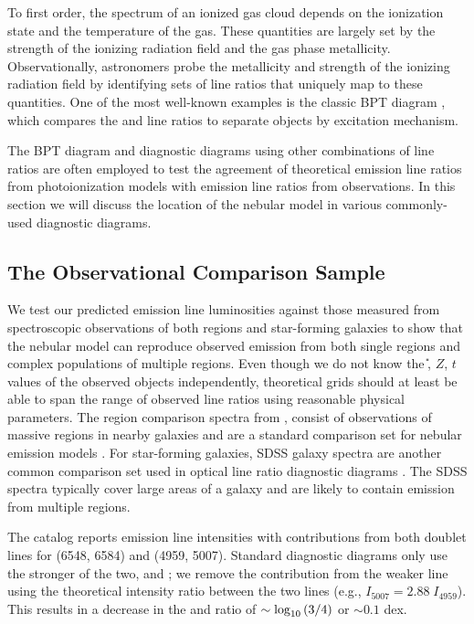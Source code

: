 To first order, the spectrum of an ionized gas cloud depends on the ionization state and the temperature of the gas. These quantities are largely set by the strength of the ionizing radiation field and the gas phase metallicity. Observationally, astronomers probe the metallicity and strength of the ionizing radiation field by identifying sets of line ratios that uniquely  map to these quantities. One of the most well-known examples is the classic BPT diagram \citep{BPT}, which compares the \niiha{} and \oiiihb{} line ratios to separate objects by excitation mechanism.

The BPT diagram and diagnostic diagrams using other combinations of line ratios are often employed to test the agreement of theoretical emission line ratios from photoionization models with emission line ratios from observations. In this section we will discuss the location of the \FSPS nebular model in various commonly-used diagnostic diagrams.

\subsection{The Observational Comparison Sample}

We test our predicted emission line luminosities against those measured from spectroscopic observations of both \hii regions and star-forming galaxies to show that the \FSPS nebular model can reproduce observed emission from both single \hii regions and complex populations of multiple \hii regions. Even though we do not know the \U{}, $Z$, $t$ values of the observed objects independently, theoretical grids should at least be able to span the range of observed line ratios using reasonable physical parameters. The \hii region comparison spectra from \citet{vanzee98}, consist of observations of massive \hii regions in nearby galaxies and are a standard comparison set for nebular emission models \citep{Dopita00, Kewley06, Levesque10, Dopita13}. For star-forming galaxies, SDSS galaxy spectra are another common comparison set used in optical line ratio diagnostic diagrams \citep{Dopita00, Kewley06, Levesque10}. The SDSS spectra typically cover large areas of a galaxy and are likely to contain emission from multiple \hii regions.

The \citet{vanzee98} catalog reports emission line intensities with contributions from both doublet lines for \nii{} (6548, 6584) and \oiii{} (4959, 5007). Standard diagnostic diagrams only use the stronger of the two, \nii{} and \oiii{}; we remove the contribution from the weaker line using the theoretical intensity ratio between the two lines (e.g., $I_{5007} = 2.88\;I_{4959}$). This results in a decrease in the \niiha{} and \oiiihb{} ratio of $\sim \log_{10} \left(3/4\right)$ or $\sim 0.1$ dex.

